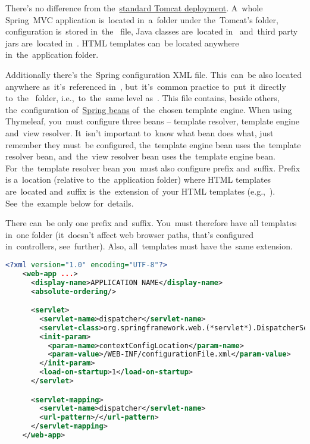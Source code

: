 There's no difference from the~\hyperref[tomcatdeployment]{standard Tomcat deployment}.
A~whole Spring~MVC application is~located in~a~folder under the~Tomcat's  folder, configuration is~stored in~the~ file, Java classes are~located in~ and~third party jars are~located in~.
HTML templates can~be located anywhere in~the~application folder.

Additionally there's the~Spring configuration XML file.
This~can~be also located anywhere as~it's~referenced in~, but~it's~common practice to~put~it directly to~the~ folder, i.e.,~to~the~same level as~.
This file contains, beside others, the~configuration of~\hyperref[springinversionofcontrol]{Spring beans} of~the~chosen template engine.
When using Thymeleaf, you~must configure three beans -- template resolver, template engine and~view resolver.
It~isn't important to~know what bean does what, just remember they must~be configured, the~template engine bean uses the~template resolver bean, and~the~view resolver bean uses the~template engine bean.
For~the~template resolver bean you~must also configure prefix and~suffix.
Prefix is a~location (relative to~the~application folder) where HTML templates are~located and~suffix is~the~extension of~your HTML templates (e.g.,~).
See~the~example below for~details.

\warning There can~be only one prefix and~suffix.
You~must therefore have all templates in~one folder (it~doesn't affect web browser paths, that's configured in~controllers, see~further).
Also, all~templates must have the~same extension.

\begin{lstlisting}[language=XML, title=Example of a~\textit{web.xml} file with a~\textit{DispatchServlet} configuration]
    <?xml version="1.0" encoding="UTF-8"?>
    <web-app ...>
      <display-name>APPLICATION NAME</display-name>
      <absolute-ordering/>

      <servlet>
        <servlet-name>dispatcher</servlet-name>
        <servlet-class>org.springframework.web.(*servlet*).DispatcherServlet </servlet-class>
        <init-param>
          <param-name>contextConfigLocation</param-name>
          <param-value>/WEB-INF/configurationFile.xml</param-value>
        </init-param>
        <load-on-startup>1</load-on-startup>
      </servlet>

      <servlet-mapping>
        <servlet-name>dispatcher</servlet-name>
        <url-pattern>/</url-pattern>
      </servlet-mapping>
    </web-app>
\end{lstlisting}
\newpage

